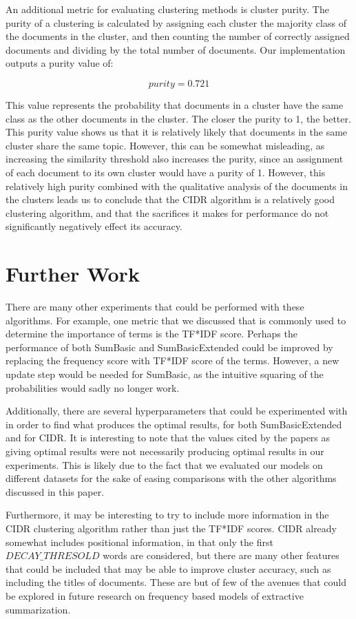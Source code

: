 \documentclass[../writeup.tex]{subfiles}
\begin{document}
An additional metric for evaluating clustering methods is cluster purity. The purity of a clustering is calculated by
assigning each cluster the majority class of the documents in the cluster, and then counting the number of correctly assigned documents and dividing by the total number of documents.
Our implementation outputs a purity value of:

$$purity = 0.721$$

This value represents the probability that documents in a cluster have the same class as the other documents in the cluster. The closer the purity to 1, the better. This purity value shows us that it is relatively likely that documents in the same cluster share the same topic. However, this can be somewhat misleading, as increasing the similarity threshold also increases the purity, since an assignment of each document to its own cluster would have a purity of 1. However, this relatively high purity combined with the qualitative analysis of the documents in the clusters leads us to conclude that the CIDR algorithm is a relatively good clustering algorithm, and that the sacrifices it makes for performance do not significantly negatively effect its accuracy.


\section{Further Work}\label{sam:sec:further_work}
There are many other experiments that could be performed with these algorithms. For example, one metric that we discussed that is commonly used to determine the importance of terms is the TF*IDF score.
Perhaps the performance of both SumBasic and SumBasicExtended could be improved by replacing the frequency score with TF*IDF score of the terms. However, a new update step would be needed for SumBasic, as the intuitive squaring of the probabilities would sadly no longer work.

Additionally, there are several hyperparameters that could be experimented with in order to find what produces the optimal results, for both SumBasicExtended and for CIDR. It is interesting to note that the values cited by the papers as giving optimal results were not necessarily producing optimal results in our experiments.
This is likely due to the fact that we evaluated our models on different datasets for the sake of easing comparisons with the other algorithms discussed in this paper. 

Furthermore, it may be interesting to try to include more information in the CIDR clustering algorithm rather than just the TF*IDF scores.
CIDR already somewhat includes positional information, in that only the first $DECAY\_THRESOLD$ words are considered, but there are many other features that could be included that may be able to improve cluster accuracy, such as including the titles of documents. These are but of few of the avenues that could be explored in future research on frequency based models of extractive summarization.
\end{document}
